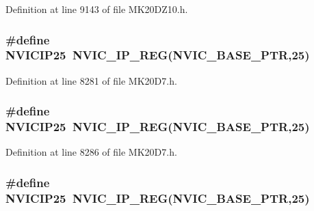 Definition at line 9143 of file M\+K20\+D\+Z10.\+h.

\subsubsection[{\texorpdfstring{N\+V\+I\+C\+I\+P25}{NVICIP25}}]{\setlength{\rightskip}{0pt plus 5cm}\#define N\+V\+I\+C\+I\+P25~{\bf N\+V\+I\+C\+\_\+\+I\+P\+\_\+\+R\+EG}({\bf N\+V\+I\+C\+\_\+\+B\+A\+S\+E\+\_\+\+P\+TR},25)}\hypertarget{group___n_v_i_c___register___accessor___macros_ga1f560cd7752e91a9e4b834f119e4e5ac}{}\label{group___n_v_i_c___register___accessor___macros_ga1f560cd7752e91a9e4b834f119e4e5ac}


Definition at line 8281 of file M\+K20\+D7.\+h.

\subsubsection[{\texorpdfstring{N\+V\+I\+C\+I\+P25}{NVICIP25}}]{\setlength{\rightskip}{0pt plus 5cm}\#define N\+V\+I\+C\+I\+P25~{\bf N\+V\+I\+C\+\_\+\+I\+P\+\_\+\+R\+EG}({\bf N\+V\+I\+C\+\_\+\+B\+A\+S\+E\+\_\+\+P\+TR},25)}\hypertarget{group___n_v_i_c___register___accessor___macros_ga1f560cd7752e91a9e4b834f119e4e5ac}{}\label{group___n_v_i_c___register___accessor___macros_ga1f560cd7752e91a9e4b834f119e4e5ac}


Definition at line 8286 of file M\+K20\+D7.\+h.

\subsubsection[{\texorpdfstring{N\+V\+I\+C\+I\+P25}{NVICIP25}}]{\setlength{\rightskip}{0pt plus 5cm}\#define N\+V\+I\+C\+I\+P25~{\bf N\+V\+I\+C\+\_\+\+I\+P\+\_\+\+R\+EG}({\bf N\+V\+I\+C\+\_\+\+B\+A\+S\+E\+\_\+\+P\+TR},25)}\hypertarget{group___n_v_i_c___register___accessor___macros_ga1f560cd7752e91a9e4b834f119e4e5ac}{}\label{group___n_v_i_c___register___accessor___macros_ga1f560cd7752e91a9e4b834f119e4e5ac}


